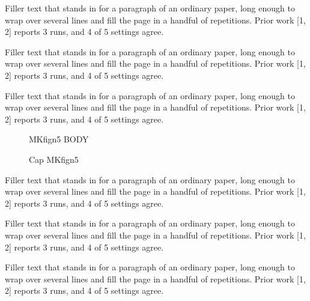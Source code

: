 \documentclass{article}
\begin{document}
Filler text that stands in for a paragraph of an ordinary paper, long enough to wrap over several lines and fill the page in a handful of repetitions. Prior work [1, 2] reports 3 runs, and 4 of 5 settings agree.\par
Filler text that stands in for a paragraph of an ordinary paper, long enough to wrap over several lines and fill the page in a handful of repetitions. Prior work [1, 2] reports 3 runs, and 4 of 5 settings agree.\par
Filler text that stands in for a paragraph of an ordinary paper, long enough to wrap over several lines and fill the page in a handful of repetitions. Prior work [1, 2] reports 3 runs, and 4 of 5 settings agree.\par
\begin{figure}[t]\centering MKfign5 BODY\caption{Cap MKfign5}\label{fig:n5}\end{figure}
Filler text that stands in for a paragraph of an ordinary paper, long enough to wrap over several lines and fill the page in a handful of repetitions. Prior work [1, 2] reports 3 runs, and 4 of 5 settings agree.\par
Filler text that stands in for a paragraph of an ordinary paper, long enough to wrap over several lines and fill the page in a handful of repetitions. Prior work [1, 2] reports 3 runs, and 4 of 5 settings agree.\par
Filler text that stands in for a paragraph of an ordinary paper, long enough to wrap over several lines and fill the page in a handful of repetitions. Prior work [1, 2] reports 3 runs, and 4 of 5 settings agree.\par
\end{document}

